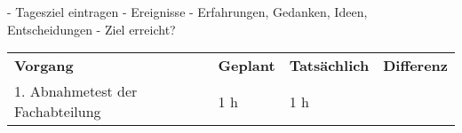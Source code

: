 - Tagesziel eintragen
- Ereignisse
- Erfahrungen, Gedanken, Ideen, Entscheidungen
- Ziel erreicht?

\begin{tabular}{llll}
\rowcolor{heading}\textbf{Vorgang} & \textbf{Geplant} & \textbf{Tatsächlich} & \textbf{Differenz} \\
1. Abnahmetest der Fachabteilung & 1 h   & 1 h   &  \\
\end{tabular}
